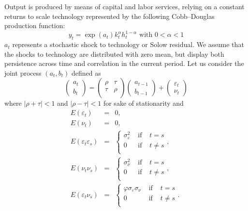 \documentclass[11pt,a4paper]{article}
\begin{document}
Output is produced by means of capital and labor services, relying on a constant returns to scale technology represented by the following Cobb--Douglas production function:
\begin{equation}
 y_t=\exp(a_t) k_t^\alpha h_t^{1-\alpha} \mbox{ with }0<\alpha<1 \label{eq:prod}
\end{equation}
$a_t$ represents a stochastic shock to technology or Solow residual. We assume that the shocks to technology are distributed with zero mean, but display both persistence across time and correlation in the current period.
Let us consider the joint process $(a_t,b_t)$ defined as
\begin{equation}
\left(
\begin{array}{c}
a_t\\b_t
\end{array}
\right)=
\left(
\begin{array}{cc}
\rho&\tau\\
\tau&\rho\\
\end{array}
\right)\left(
\begin{array}{c}
a_{t-1}\\b_{t-1}
\end{array}
\right)
+\left(
\begin{array}{c}
\varepsilon_t\\ \nu_t
\end{array}
\right)  \label{eq:process}
\end{equation}
where $|\rho+\tau|<1$ and $|\rho-\tau|<1 $ for sake of stationarity and
\begin{eqnarray*}
E(\varepsilon_t)&=& 0,\\
E(\nu_t)&=& 0,\\
E(\varepsilon_t\varepsilon_s)&=&\left\{
\begin{array}{lcl}
\sigma^2_\varepsilon & \mbox{ if } & t=s \\
0 & \mbox{ if } & t\neq s \\
\end{array}\right. \mbox{, }\\
E(\nu_t\nu_s)&=&\left\{
\begin{array}{lcl}
\sigma^2_\nu & \mbox{ if } & t=s \\
0 & \mbox{ if } & t\neq s \\
\end{array}\right. \mbox{, } \\
E(\varepsilon_t\nu_s)&=&\left\{
\begin{array}{lcl}
\varphi\sigma_\varepsilon\sigma_\nu & \mbox{ if } & t=s \\
0 & \mbox{ if } & t\neq s \\
\end{array}\right. \mbox{. }
\end{eqnarray*}
\end{document}
